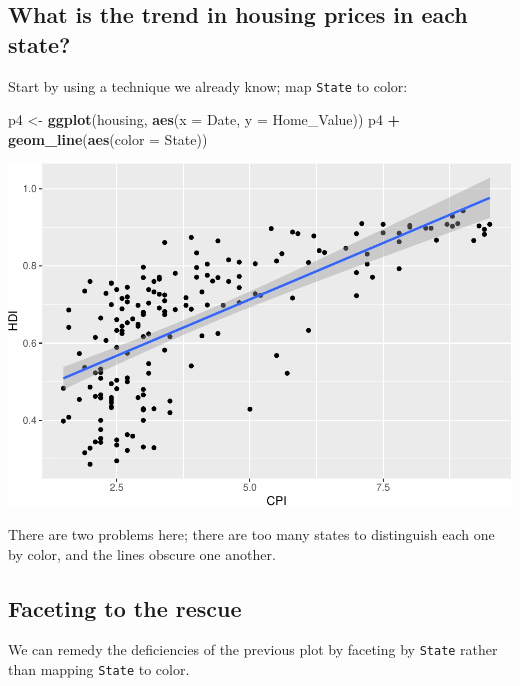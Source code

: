 \documentclass[
]{book}
\newenvironment{Shaded}{\begin{snugshade}}{\end{snugshade}}
\newcommand{\DataTypeTok}[1]{\textcolor[rgb]{0.13,0.29,0.53}{#1}}
\newcommand{\KeywordTok}[1]{\textcolor[rgb]{0.13,0.29,0.53}{\textbf{#1}}}
\newcommand{\NormalTok}[1]{#1}
\newcommand{\OperatorTok}[1]{\textcolor[rgb]{0.81,0.36,0.00}{\textbf{#1}}}
\newcommand{\StringTok}[1]{\textcolor[rgb]{0.31,0.60,0.02}{#1}}
\begin{document}
\hypertarget{what-is-the-trend-in-housing-prices-in-each-state}{%
\subsection{What is the trend in housing prices in each state?}\label{what-is-the-trend-in-housing-prices-in-each-state}}

Start by using a technique we already know; map \texttt{State} to color:

\begin{Shaded}
\begin{Highlighting}[]
\NormalTok{p4 \textless{}{-}}\StringTok{ }\KeywordTok{ggplot}\NormalTok{(housing, }\KeywordTok{aes}\NormalTok{(}\DataTypeTok{x =}\NormalTok{ Date, }\DataTypeTok{y =}\NormalTok{ Home\_Value))}
\NormalTok{p4 }\OperatorTok{+}\StringTok{ }\KeywordTok{geom\_line}\NormalTok{(}\KeywordTok{aes}\NormalTok{(}\DataTypeTok{color =}\NormalTok{ State))  }
\end{Highlighting}
\end{Shaded}

\includegraphics{R/Rgraphics/figures/unnamed-chunk-205-1.pdf}

There are two problems here; there are too many states to distinguish each one by color, and the lines obscure one another.

\hypertarget{faceting-to-the-rescue}{%
\subsection{Faceting to the rescue}\label{faceting-to-the-rescue}}

We can remedy the deficiencies of the previous plot by faceting by \texttt{State} rather than mapping \texttt{State} to color.
\end{document}
